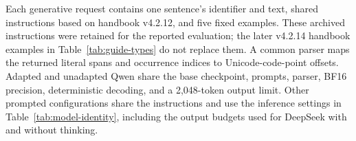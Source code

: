 Each generative request contains one sentence's identifier and text, shared instructions based on handbook v4.2.12, and five fixed examples. These archived instructions were retained for the reported evaluation; the later v4.2.14 handbook examples in Table~\ref{tab:guide-types} do not replace them. A common parser maps the returned literal spans and occurrence indices to Unicode-code-point offsets. Adapted and unadapted Qwen share the base checkpoint, prompts, parser, BF16 precision, deterministic decoding, and a 2,048-token output limit. Other prompted configurations share the instructions and use the inference settings in Table~\ref{tab:model-identity}, including the output budgets used for DeepSeek with and without thinking.
